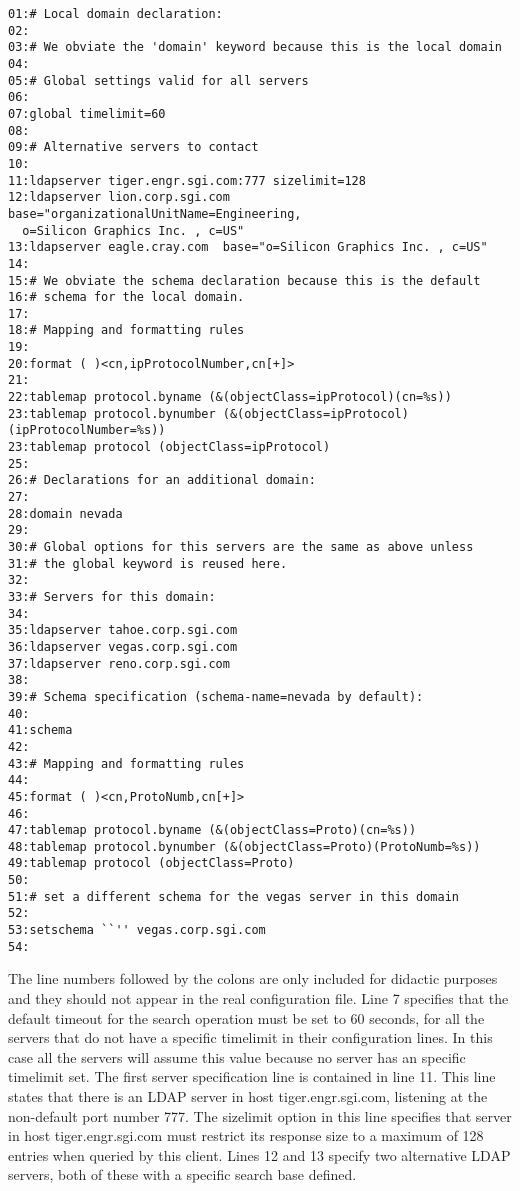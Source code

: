 \begin{verbatim}
01:# Local domain declaration:
02:
03:# We obviate the 'domain' keyword because this is the local domain
04:
05:# Global settings valid for all servers
06:
07:global timelimit=60
08:
09:# Alternative servers to contact
10:
11:ldapserver tiger.engr.sgi.com:777 sizelimit=128
12:ldapserver lion.corp.sgi.com base="organizationalUnitName=Engineering,
  o=Silicon Graphics Inc. , c=US"
13:ldapserver eagle.cray.com  base="o=Silicon Graphics Inc. , c=US"
14:
15:# We obviate the schema declaration because this is the default 
16:# schema for the local domain.
17:
18:# Mapping and formatting rules
19:
20:format ( )<cn,ipProtocolNumber,cn[+]>
21:
22:tablemap protocol.byname (&(objectClass=ipProtocol)(cn=%s))
23:tablemap protocol.bynumber (&(objectClass=ipProtocol)(ipProtocolNumber=%s))
23:tablemap protocol (objectClass=ipProtocol)
25:
26:# Declarations for an additional domain:
27:
28:domain nevada
29:
30:# Global options for this servers are the same as above unless
31:# the global keyword is reused here.
32:
33:# Servers for this domain:
34:
35:ldapserver tahoe.corp.sgi.com
36:ldapserver vegas.corp.sgi.com
37:ldapserver reno.corp.sgi.com
38:
39:# Schema specification (schema-name=nevada by default):
40:
41:schema
42: 
43:# Mapping and formatting rules
44:
45:format ( )<cn,ProtoNumb,cn[+]>
46:
47:tablemap protocol.byname (&(objectClass=Proto)(cn=%s))
48:tablemap protocol.bynumber (&(objectClass=Proto)(ProtoNumb=%s))
49:tablemap protocol (objectClass=Proto)
50:
51:# set a different schema for the vegas server in this domain
52:
53:setschema ``'' vegas.corp.sgi.com
54:
\end{verbatim}

The line numbers followed by the colons are only included for didactic
purposes and they should not appear in the real configuration file. 
Line 7 specifies that the default timeout for the search operation
must be set to 60 seconds, for all the servers that do not have a
specific timelimit in their configuration lines. In this case all the
servers will assume this value because no server has an specific
timelimit set. The first server specification line is contained in
line 11. This line states that there is an LDAP server in host
tiger.engr.sgi.com, listening at the non-default port number 777. The
sizelimit option in this line specifies that server in host
tiger.engr.sgi.com must restrict its response size to a maximum of
128 entries when queried by this client. Lines 12 and 13 specify two
alternative LDAP servers, both of these with a specific search base
defined.

